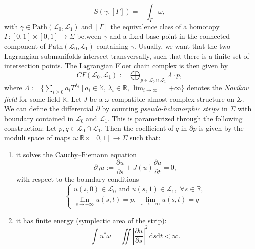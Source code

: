 \documentclass[11pt,colorinlistoftodos]{amsart}
\numberwithin{equation}{subsection}
\theoremstyle{plain}
\theoremstyle{definition}
\theoremstyle{remark}
\newcommand{\R}{\mathbb{R}}
\newcommand{\dd}{{\mathrm{d}}}
\newcommand{\de}{\partial}
\newcommand{\calL}{\mathcal{L}}
\begin{document}
\[
S(\gamma,[\Gamma])=-\int_\Gamma \omega,
\]
with $\gamma\in \mathrm{Path}(\calL_0,\calL_1)$ and $[\Gamma]$ the equivalence class of a homotopy $\Gamma\colon [0,1]\times[0,1]\to \Sigma$ between $\gamma$ and a fixed base point in the connected component of $\mathrm{Path}(\calL_0,\calL_1)$ containing $\gamma$. Usually, we want that the two Lagrangian submanifolds intersect transversally, such that there is a finite set of intersection points. The Lagrangian Floer chain complex is then given by 
\[
CF(\calL_0,\calL_1):=\bigoplus_{p\in \calL_0\cap \calL_1}\Lambda\cdot p,
\]
where $\Lambda:=\{\sum_{i\geq 0}a_iT^{\lambda_i}\mid a_i\in \mathbb{K},\, \lambda_i\in\R,\, \lim_{i\to \infty}=+\infty\}$ denotes the \emph{Novikov field} for some field $\mathbb{K}$. 
Let $J$ be a $\omega$-compatible almost-complex structure on $\Sigma$. We can define the differential $\de$ by counting \emph{pseudo-holomorphic strips} in $\Sigma$ with boundary contained in $\calL_0$ and $\calL_1$. This is parametrized through the following construction: Let $p,q\in \calL_0\cap \calL_1$. Then the coefficient of $q$ in $\de p$ is given by the moduli space of maps $u\colon \R\times[0,1]\to \Sigma$ 
such that:
\begin{enumerate}
\item it solves the Cauchy--Riemann equation 
\[
\bar \de_J u:=\frac{\de u}{\de s}+J(u)\frac{\de u}{\de t}=0,
\]
with respect to the boundary conditions
\[
\begin{cases}u(s,0)\in \calL_0\text{ and }u(s,1)\in \calL_1,\,\, \forall s\in \R,\\
\lim_{s\to +\infty}u(s,t)=p,\,\, \lim_{s\to -\infty}u(s,t)=q\end{cases}
\]
\item it has finite energy (symplectic area of the strip):
\[
\int u^*\omega=\iint \left\vert \frac{\de u}{\de s}\right\vert^2\, \dd s\dd t<\infty.
\]
\end{enumerate}
\end{document}
